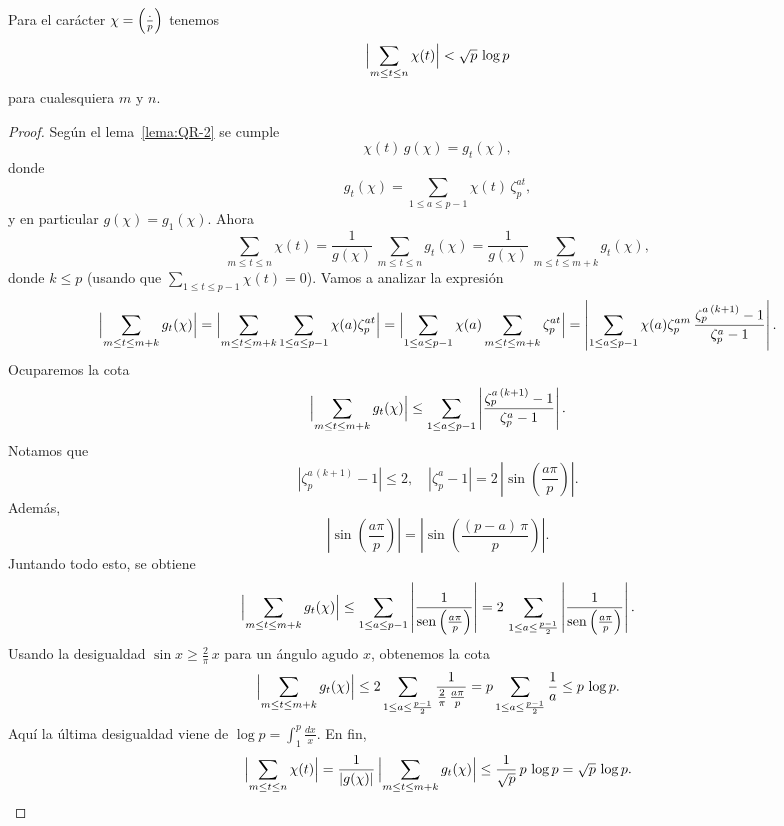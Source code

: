 \begin{proposicion}
  Para el carácter $\chi = \legendre{\cdot}{p}$ tenemos
  $$\Bigl|\sum_{m \le t \le n} \chi (t)\Bigr| < \sqrt{p}\,\log p$$
  para cualesquiera $m$ y $n$.

  \begin{proof}
    Según el lema~\ref{lema:QR-2} se cumple
    $$\chi (t) \, g (\chi) = g_t (\chi),$$
    donde
    $$g_t (\chi) = \sum_{1 \le a \le p-1} \chi(t)\,\zeta_p^{at},$$
    y en particular $g (\chi) = g_1 (\chi)$. Ahora
    \[ \sum_{m \le t \le n} \chi(t) =
       \frac{1}{g (\chi)}\,\sum_{m \le t \le n} g_t (\chi) =
       \frac{1}{g (\chi)}\,\sum_{m \le t \le m+k} g_t (\chi), \]
    donde $k \le p$ (usando que $\sum_{1 \le t \le p-1} \chi(t) = 0$).
    Vamos a analizar la expresión
    \[ \Bigl|\sum_{m \le t \le m+k} g_t (\chi)\Bigr| =
       \Bigl|\sum_{m \le t \le m+k} \sum_{1 \le a \le p-1} \chi(a) \zeta_p^{at}\Bigr| =
       \Bigl|\sum_{1 \le a \le p-1} \chi(a) \sum_{m \le t \le m+k} \zeta_p^{at}\Bigr| =
       \left|\sum_{1 \le a \le p-1} \chi(a) \zeta_p^{am}\,\frac{\zeta_p^{a\,(k+1)} - 1}{\zeta_p^a - 1}\right|. \]
    Ocuparemos la cota
    \[ \Bigl|\sum_{m \le t \le m+k} g_t (\chi)\Bigr| \le
       \sum_{1 \le a \le p-1} \left|\frac{\zeta_p^{a\,(k+1)} - 1}{\zeta_p^a - 1}\right|. \]
    Notamos que
    \[ |\zeta_p^{a\,(k+1)} - 1| \le 2, \quad
       |\zeta_p^a - 1| = 2\,\left|\sin \left(\frac{a\pi}{p}\right)\right|. \]
    Además,
    \[ \left|\sin \left(\frac{a\pi}{p}\right)\right| =
       \left|\sin \left(\frac{(p-a)\,\pi}{p}\right)\right|. \]
    Juntando todo esto, se obtiene
    \[ \Bigl|\sum_{m \le t \le m+k} g_t (\chi)\Bigr| \le
       \sum_{1 \le a \le p-1} \left|\frac{1}{\sin \left(\frac{a\pi}{p}\right)}\right| =
       2\,\sum_{1 \le a \le \frac{p-1}{2}} \left|\frac{1}{\sin \left(\frac{a\pi}{p}\right)}\right|. \]
    Usando la desigualdad $\sin x \ge \frac{2}{\pi}\,x$ para un ángulo agudo
    $x$, obtenemos la cota
    \[ \Bigl|\sum_{m \le t \le m+k} g_t (\chi)\Bigr| \le
       2\sum_{1 \le a \le \frac{p-1}{2}} \frac{1}{\frac{2}{\pi}\,\frac{a \pi}{p}} =
       p\sum_{1 \le a \le \frac{p-1}{2}} \frac{1}{a} \le p\,\log p. \]
    Aquí la última desigualdad viene de $\log p = \int_1^p \frac{dx}{x}$.
    En fin,
    \[ \Bigl|\sum_{m \le t \le n} \chi (t)\Bigr| =
       \frac{1}{|g (\chi)|}\,\Bigl|\sum_{m \le t \le m+k} g_t (\chi)\Bigr| \le
       \frac{1}{\sqrt{p}}\,p\,\log p =
       \sqrt{p}\,\log p. \qedhere \]
  \end{proof}
\end{proposicion}

